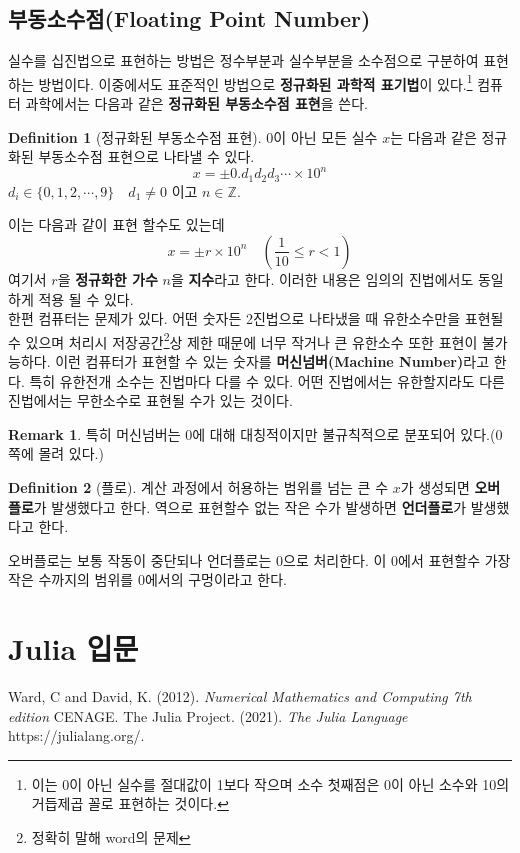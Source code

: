 \documentclass[a4paper, 11pt]{report}
\theoremstyle{definition}
\newtheorem*{defn}{Definition}
\newtheorem*{rmk}{Remark}
\begin{document}
\section{부동소수점(Floating Point Number)}
실수를 십진법으로 표현하는 방법은 정수부분과 실수부분을 소수점으로 구분하여 표현하는 방법이다.
이중에서도 표준적인 방법으로 \textbf{정규화된 과학적 표기법}이 있다.\footnote{이는 0이 아닌 실수를 절대값이 1보다 작으며 소수 첫째점은 0이 아닌 소수와 10의 거듭제곱 꼴로 표현하는 것이다.}
컴퓨터 과학에서는 다음과 같은 \textbf{정규화된 부동소수점 표현}을 쓴다.  
\begin{defn}[정규화된 부동소수점 표현]
$0$이 아닌 모든 실수 $x$는 다음과 같은 정규화된 부동소수점 표현으로 나타낼 수 있다.
\begin{equation}
    x = \pm 0.d_1d_2d_3\cdots \times 10^n
\end{equation}
$d_i \in \{0, 1, 2, \cdots ,9\} \quad d_1 \neq 0$ 이고 $n \in \mathbb{Z}$.
\end{defn}
이는 다음과 같이 표현 할수도 있는데 
\[
    x = \pm r \times 10^n \quad (\frac{1}{10} \leq r < 1)
\]
여기서 $r$을 \textbf{정규화한 가수} $n$을 \textbf{지수}라고 한다. 
이러한 내용은 임의의 진법에서도 동일하게 적용 될 수 있다. \\
한편 컴퓨터는 문제가 있다. 어떤 숫자든 2진법으로 나타냈을 때 유한소수만을 표현될 수 있으며
처리시 저장공간\footnote{정확히 말해 word의 문제}상 제한 때문에 너무 작거나 큰 유한소수 또한 표현이 불가능하다.
이런 컴퓨터가 표현할 수 있는 숫자를 \textbf{머신넘버(Machine Number)}라고 한다. 특히 유한전개 소수는 진법마다 다를 수 있다.
어떤 진법에서는 유한할지라도 다른 진법에서는 무한소수로 표현될 수가 있는 것이다. 
\begin{rmk}
    특히 머신넘버는 0에 대해 대칭적이지만 불규칙적으로 분포되어 있다.(0쪽에 몰려 있다.)
\end{rmk}
\begin{defn}[플로]
    계산 과정에서 허용하는 범위를 넘는 큰 수 $x$가 생성되면 \textbf{오버플로}가 발생했다고 한다.
    역으로 표현할수 없는 작은 수가 발생하면 \textbf{언더플로}가 발생했다고 한다.
\end{defn}
오버플로는 보통 작동이 중단되나 언더플로는 0으로 처리한다. 이 0에서 표현할수 가장 작은 수까지의 범위를 0에서의 구멍이라고 한다.


\appendix


\chapter{Julia  입문}

\begin{thebibliography}{123456}
     Ward, C and David, K. (2012). \emph{Numerical Mathematics and Computing 7th edition} CENAGE.
     The Julia Project. (2021). \emph{The Julia Language} https://julialang.org/.
\end{thebibliography}
\end{document}

